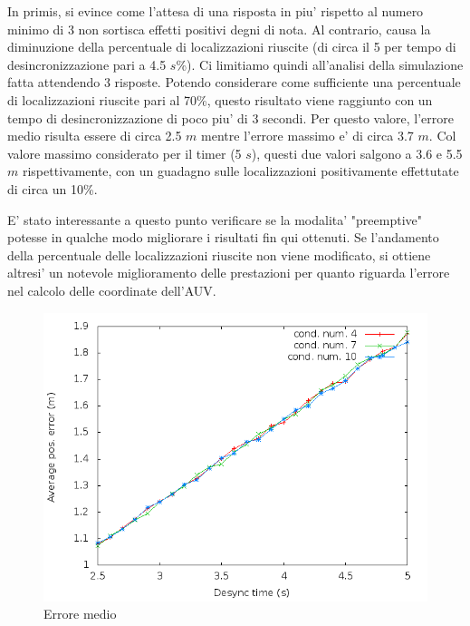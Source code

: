 In primis, si evince come l'attesa di una risposta in piu' rispetto al numero minimo di 3 non sortisca effetti positivi degni di nota. Al contrario, causa la diminuzione della percentuale di localizzazioni riuscite (di circa il 5 per tempo di desincronizzazione pari a 4.5 $s$\%).
Ci limitiamo quindi all'analisi della simulazione fatta attendendo 3 risposte.
Potendo considerare come sufficiente una percentuale di localizzazioni riuscite pari al 70\%, questo risultato viene raggiunto con un tempo di desincronizzazione di poco piu' di 3 secondi. Per questo valore, l'errore medio risulta essere di circa 2.5 $m$ mentre l'errore massimo e' di circa 3.7 $m$.
Col valore massimo considerato per il timer (5 $s$), questi due valori salgono a 3.6 e 5.5 $m$ rispettivamente, con un guadagno sulle localizzazioni positivamente effettutate di circa un 10\%.

E' stato interessante a questo punto verificare se la modalita' "preemptive" potesse in qualche modo migliorare i risultati fin qui ottenuti.
Se l'andamento della percentuale delle localizzazioni riuscite non viene modificato, si ottiene altresi' un notevole miglioramento delle prestazioni per quanto riguarda l'errore nel calcolo delle coordinate dell'AUV.

\begin{figure}
    \centering
    \includegraphics[scale=0.5]{squaresimulation/avposerrorreq3preempt1drop0speed1.png}
    \caption{Errore medio}
    \label{fig:squaresimulation/avposerrorreq3preempt1drop0speed1}
\end{figure}

